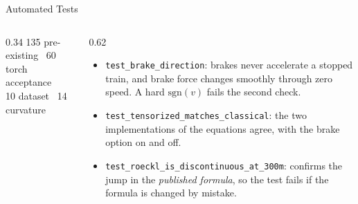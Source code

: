 \begin{frame}{Automated Tests}
  \vspace{0.6em}
  \begin{columns}[c,onlytextwidth]
    \begin{column}{0.34\textwidth}
      \centering
      \vspace{0.5em}
      {\footnotesize 135 pre-existing \textbullet\ 60 torch acceptance\\
       10 dataset \textbullet\ 14 curvature}
    \end{column}
    \begin{column}{0.62\textwidth}
      \begin{itemize}\setlength\itemsep{0.6em}
        \item \texttt{test\_brake\_direction}: brakes never accelerate a
              stopped train, and brake force changes smoothly through zero
              speed. A hard $\mathrm{sgn}(v)$ fails the second check.
        \item \texttt{test\_tensorized\_matches\_classical}: the two
              implementations of the equations agree, with the brake option on
              and off.
        \item \texttt{test\_roeckl\_is\_discontinuous\_at\_300m}: confirms the
              jump in the \emph{published formula}, so the test fails if the
              formula is changed by mistake.
      \end{itemize}
    \end{column}
  \end{columns}
\end{frame}
